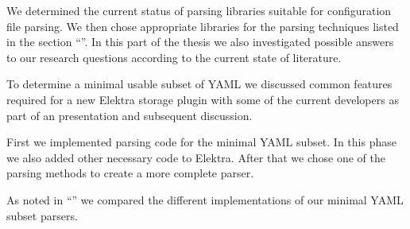 \begin{description}[style=multiline, leftmargin=3.4cm, font=\bfseries]

  \item[Literature Review] We determined the current status of parsing libraries suitable for configuration file parsing. We then chose appropriate libraries for the parsing techniques listed in the section “”. In this part of the thesis we also investigated possible answers to our research questions according to the current state of literature.

  \item[YAML Subset] To determine a minimal usable subset of YAML we discussed common features required for a new Elektra storage plugin with some of the current developers as part of an presentation and subsequent discussion.

  \item[Implementation] First we implemented parsing code for the minimal YAML subset. In this phase we also added other necessary code to Elektra. After that we chose one of the parsing methods to create a more complete  parser.

  \item[Comparison] As noted in “” we compared the different implementations of our minimal YAML subset parsers.

\end{description}
